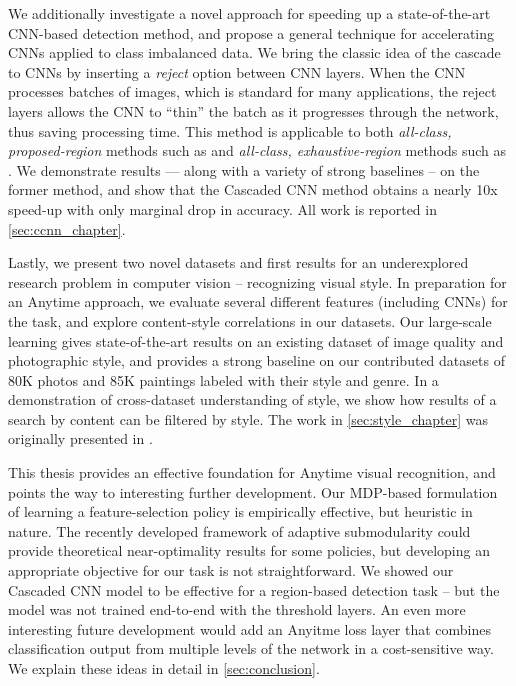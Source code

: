 We additionally investigate a novel approach for speeding up a state-of-the-art CNN-based detection method, and propose a general technique for accelerating CNNs applied to class imbalanced data.
We bring the classic idea of the cascade to CNNs by inserting a \emph{reject} option between CNN layers.
When the CNN processes batches of images, which is standard for many applications, the reject layers allows the CNN to ``thin'' the batch as it progresses through the network, thus saving processing time.
This method is applicable to both \emph{all-class, proposed-region} methods such as \cite{Girshick-CVPR-2014} and \emph{all-class, exhaustive-region} methods such as \cite{He-ECCV-2014}.
We demonstrate results --- along with a variety of strong baselines -- on the former method, and show that the Cascaded CNN method obtains a nearly 10x speed-up with only marginal drop in accuracy.
All work is reported in \autoref{sec:ccnn_chapter}.

Lastly, we present two novel datasets and first results for an underexplored research problem in computer vision -- recognizing visual style.
In preparation for an Anytime approach, we evaluate several different features (including CNNs) for the task, and explore content-style correlations in our datasets.
Our large-scale learning gives state-of-the-art results on an existing dataset of image quality and photographic style, and provides a strong baseline on our contributed datasets of 80K photos and 85K paintings labeled with their style and genre.
In a demonstration of cross-dataset understanding of style, we show how results of a search by content can be filtered by style.
The work in \autoref{sec:style_chapter} was originally presented in \cite{Karayev-BMVC-2014}.

This thesis provides an effective foundation for Anytime visual recognition, and points the way to interesting further development.
Our MDP-based formulation of learning a feature-selection policy is empirically effective, but heuristic in nature.
The recently developed framework of adaptive submodularity \parencite{Golovin-and-Krause-2010-JAIR} could provide theoretical near-optimality results for some policies, but developing an appropriate objective for our task is not straightforward.
We showed our Cascaded CNN model to be effective for a region-based detection task -- but the model was not trained end-to-end with the threshold layers.
An even more interesting future development would add an Anyitme loss layer that combines classification output from multiple levels of the network in a cost-sensitive way.
We explain these ideas in detail in \autoref{sec:conclusion}.
